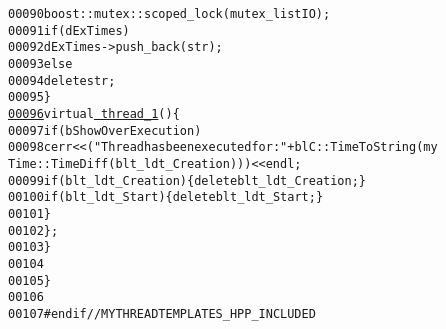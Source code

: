 \begin{footnotesize}
\begin{alltt}
00090                 boost::mutex::scoped\_lock(mutex\_listIO);
00091                 \textcolor{keywordflow}{if} (dExTimes)
00092                     dExTimes->push\_back(str);
00093                 \textcolor{keywordflow}{else}
00094                     \textcolor{keyword}{delete} str;
00095             \}
\hypertarget{myThreadTemplates_8hpp_source_l00096}{}\hyperlink{classbuskol_1_1ThreadTemplates_1_1thread__1_a7e53c5d7bef0898efc1c1bb217c6319a}{00096}             \textcolor{keyword}{virtual} \hyperlink{classbuskol_1_1ThreadTemplates_1_1thread__1_a7e53c5d7bef0898efc1c1bb217c6319a}{~thread_1}()\{
00097                 \textcolor{keywordflow}{if} (bShowOverExecution)
00098                     cerr<<(\textcolor{stringliteral}{"Thread has been executed for: "}+ blC::TimeToString(my
      Time::TimeDiff(blt\_ldt\_Creation)))<<endl;
00099                 \textcolor{keywordflow}{if} ( blt\_ldt\_Creation ) \{ \textcolor{keyword}{delete} blt\_ldt\_Creation; \}
00100                 \textcolor{keywordflow}{if} ( blt\_ldt\_Start ) \{ \textcolor{keyword}{delete} blt\_ldt\_Start; \}
00101             \}
00102         \};
00103     \}
00104 
00105 \}
00106 
00107 \textcolor{preprocessor}{#endif // MYTHREADTEMPLATES\_HPP\_INCLUDED}
\end{alltt}\end{footnotesize}
